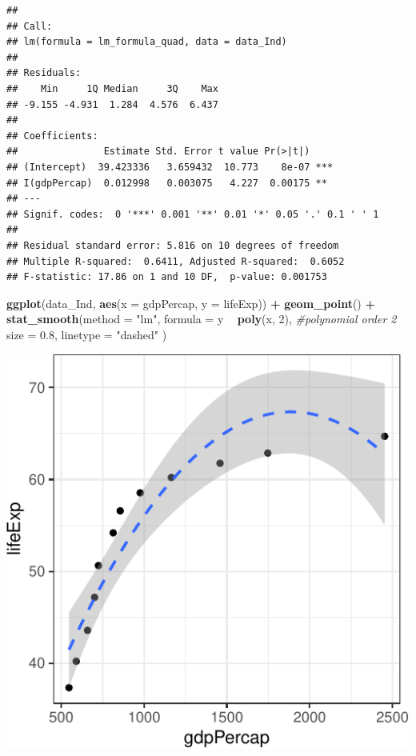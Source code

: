 \documentclass[12pt,]{article}
\newenvironment{Shaded}{\begin{snugshade}}{\end{snugshade}}
\newcommand{\KeywordTok}[1]{\textcolor[rgb]{0.13,0.29,0.53}{\textbf{#1}}}
\newcommand{\DataTypeTok}[1]{\textcolor[rgb]{0.13,0.29,0.53}{#1}}
\newcommand{\DecValTok}[1]{\textcolor[rgb]{0.00,0.00,0.81}{#1}}
\newcommand{\FloatTok}[1]{\textcolor[rgb]{0.00,0.00,0.81}{#1}}
\newcommand{\StringTok}[1]{\textcolor[rgb]{0.31,0.60,0.02}{#1}}
\newcommand{\CommentTok}[1]{\textcolor[rgb]{0.56,0.35,0.01}{\textit{#1}}}
\newcommand{\OperatorTok}[1]{\textcolor[rgb]{0.81,0.36,0.00}{\textbf{#1}}}
\newcommand{\NormalTok}[1]{#1}
\begin{document}
\begin{verbatim}
## 
## Call:
## lm(formula = lm_formula_quad, data = data_Ind)
## 
## Residuals:
##    Min     1Q Median     3Q    Max 
## -9.155 -4.931  1.284  4.576  6.437 
## 
## Coefficients:
##               Estimate Std. Error t value Pr(>|t|)    
## (Intercept)  39.423336   3.659432  10.773    8e-07 ***
## I(gdpPercap)  0.012998   0.003075   4.227  0.00175 ** 
## ---
## Signif. codes:  0 '***' 0.001 '**' 0.01 '*' 0.05 '.' 0.1 ' ' 1
## 
## Residual standard error: 5.816 on 10 degrees of freedom
## Multiple R-squared:  0.6411, Adjusted R-squared:  0.6052 
## F-statistic: 17.86 on 1 and 10 DF,  p-value: 0.001753
\end{verbatim}

\begin{Shaded}
\begin{Highlighting}[]
\KeywordTok{ggplot}\NormalTok{(data_Ind, }\KeywordTok{aes}\NormalTok{(}\DataTypeTok{x =}\NormalTok{ gdpPercap, }\DataTypeTok{y =}\NormalTok{ lifeExp)) }\OperatorTok{+}
\StringTok{  }\KeywordTok{geom_point}\NormalTok{() }\OperatorTok{+}
\StringTok{  }\KeywordTok{stat_smooth}\NormalTok{(}\DataTypeTok{method =} \StringTok{"lm"}\NormalTok{, }
              \DataTypeTok{formula =}\NormalTok{ y }\OperatorTok{~}\StringTok{ }\KeywordTok{poly}\NormalTok{(x, }\DecValTok{2}\NormalTok{), }\CommentTok{#polynomial order 2}
              \DataTypeTok{size =} \FloatTok{0.8}\NormalTok{,}
              \DataTypeTok{linetype =} \StringTok{"dashed"}
\NormalTok{              )}
\end{Highlighting}
\end{Shaded}

\begin{center}\includegraphics{Intro_tips_tricks_files/figure-latex/data_Ind_lm_quad-1} \end{center}
\end{document}
